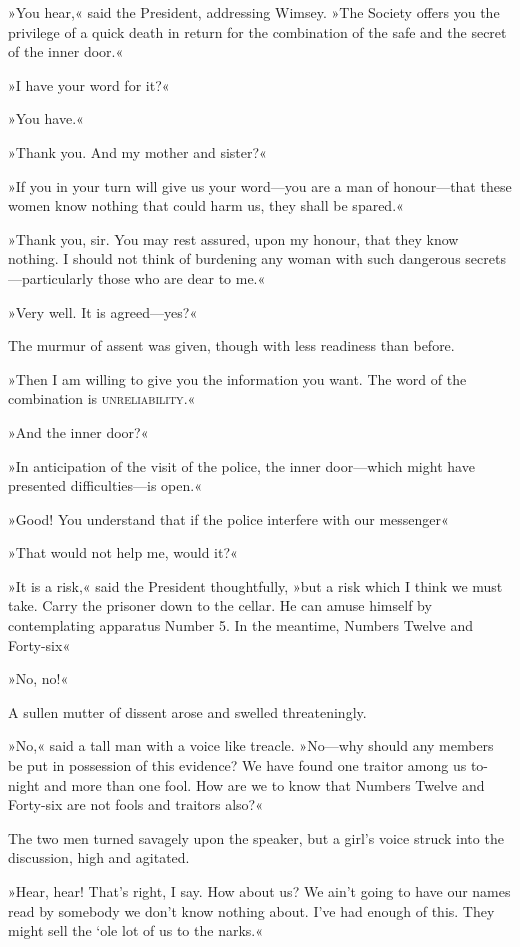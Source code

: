 »You hear,« said the President, addressing Wimsey. »The Society offers you the privilege of a quick death in return for the combination of the safe and the secret of the inner door.«

»I have your word for it?«

»You have.«

»Thank you. And my mother and sister?«

»If you in your turn will give us your word—you are a man of honour—that these women know nothing that could harm us, they shall be spared.«

»Thank you, sir. You may rest assured, upon my honour, that they know nothing. I should not think of burdening any woman with such dangerous secrets—particularly those who are dear to me.«

»Very well. It is agreed—yes?«

The murmur of assent was given, though with less readiness than before.

»Then I am willing to give you the information you want. The word of the combination is \textsc{unreliability}.«

»And the inner door?«

»In anticipation of the visit of the police, the inner door—which might have presented difficulties—is open.«

»Good! You understand that if the police interfere with our messenger\longdash«

»That would not help me, would it?«

»It is a risk,« said the President thoughtfully, »but a risk which I think we must take. Carry the prisoner down to the cellar. He can amuse himself by contemplating apparatus Number 5. In the meantime, Numbers Twelve and Forty-six\longdash«

»No, no!«

A sullen mutter of dissent arose and swelled threateningly.

»No,« said a tall man with a voice like treacle. »No—why should any members be put in possession of this evidence? We have found one traitor among us to-night and more than one fool. How are we to know that Numbers Twelve and Forty-six are not fools and traitors also?«

The two men turned savagely upon the speaker, but a girl's voice struck into the discussion, high and agitated.

»Hear, hear! That's right, I say. How about us? We ain't going to have our names read by somebody we don't know nothing about. I've had enough of this. They might sell the `ole lot of us to the narks.«

